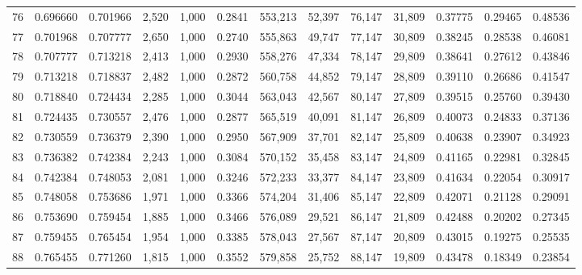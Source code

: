 \begin{tabular}{rrrrrrrrrrrrr}
76  &  0.696660 &  0.701966 &   2,520 &  1,000 &                                     0.2841 &  553,213 &   52,397 &   76,147 &   31,809 &  0.37775 &  0.29465 &  0.48536 \\
77  &  0.701968 &  0.707777 &   2,650 &  1,000 &                                     0.2740 &  555,863 &   49,747 &   77,147 &   30,809 &  0.38245 &  0.28538 &  0.46081 \\
78  &  0.707777 &  0.713218 &   2,413 &  1,000 &                                     0.2930 &  558,276 &   47,334 &   78,147 &   29,809 &  0.38641 &  0.27612 &  0.43846 \\
79  &  0.713218 &  0.718837 &   2,482 &  1,000 &                                     0.2872 &  560,758 &   44,852 &   79,147 &   28,809 &  0.39110 &  0.26686 &  0.41547 \\
80  &  0.718840 &  0.724434 &   2,285 &  1,000 &                                     0.3044 &  563,043 &   42,567 &   80,147 &   27,809 &  0.39515 &  0.25760 &  0.39430 \\
81  &  0.724435 &  0.730557 &   2,476 &  1,000 &                                     0.2877 &  565,519 &   40,091 &   81,147 &   26,809 &  0.40073 &  0.24833 &  0.37136 \\
82  &  0.730559 &  0.736379 &   2,390 &  1,000 &                                     0.2950 &  567,909 &   37,701 &   82,147 &   25,809 &  0.40638 &  0.23907 &  0.34923 \\
83  &  0.736382 &  0.742384 &   2,243 &  1,000 &                                     0.3084 &  570,152 &   35,458 &   83,147 &   24,809 &  0.41165 &  0.22981 &  0.32845 \\
84  &  0.742384 &  0.748053 &   2,081 &  1,000 &                                     0.3246 &  572,233 &   33,377 &   84,147 &   23,809 &  0.41634 &  0.22054 &  0.30917 \\
85  &  0.748058 &  0.753686 &   1,971 &  1,000 &                                     0.3366 &  574,204 &   31,406 &   85,147 &   22,809 &  0.42071 &  0.21128 &  0.29091 \\
86  &  0.753690 &  0.759454 &   1,885 &  1,000 &                                     0.3466 &  576,089 &   29,521 &   86,147 &   21,809 &  0.42488 &  0.20202 &  0.27345 \\
87  &  0.759455 &  0.765454 &   1,954 &  1,000 &                                     0.3385 &  578,043 &   27,567 &   87,147 &   20,809 &  0.43015 &  0.19275 &  0.25535 \\
88  &  0.765455 &  0.771260 &   1,815 &  1,000 &                                     0.3552 &  579,858 &   25,752 &   88,147 &   19,809 &  0.43478 &  0.18349 &  0.23854 \\

\end{tabular}
